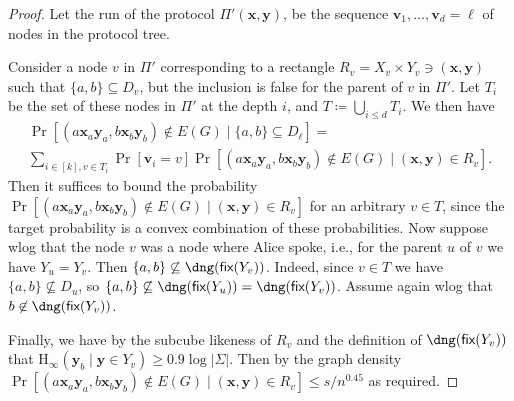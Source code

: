 \documentclass[10pt,a4paper]{article}
\theoremstyle{definition}
\theoremstyle{remark}
\theoremstyle{example}
\theoremstyle{plain}
\newcommand{\fix}{\textsf{\upshape fix}}
\newcommand{\Hmin}{\mathrm{H}_{\infty}}
\newcommand{\xbf}{\bm{x}}
\newcommand{\ybf}{\bm{y}}
\newcommand{\vbf}{\bm{v}}
\newcommand{\protocolPiAlt}{\Pi'}
\begin{document}
{}{
\begin{proof}
Let the run of the protocol $\protocolPiAlt(\xbf,\ybf)$, be the sequence $\vbf_1, \dots, \vbf_d = \bm \ell$ of nodes in the protocol tree. 


Consider a node $v$ in $\protocolPiAlt$ corresponding to a rectangle $R_v = X_v \times Y_v \ni (\bm x, \bm y)$ such that $\{a,b\} \subseteq D_v$, but the inclusion is false for the parent of $v$ in $\protocolPiAlt$. Let $T_{i}$ be the set of these nodes in $\protocolPiAlt$ at the depth $i$, and $T \coloneqq \bigcup_{i \le d} T_i$. We then have
 \begin{multline*}
\Pr[(a \bm x_a \bm y_a, b \bm x_b \bm y_b) \not\in E(G) \mid \{a,b\} \subseteq D_{\bm \ell}] = \\\sum_{i \in [k], v \in T_{i}} \Pr[\bm v_i = v] \Pr[(a \bm x_a \bm y_a, b \bm x_b \bm y_b) \not\in E(G) \mid (\bm x, \bm y) \in R_v].
 \end{multline*}
Then it suffices to bound the probability $\Pr[(a \bm x_a \bm y_a, b \bm x_b \bm y_b) \not\in E(G) \mid (\bm x, \bm y) \in R_v]$ for an arbitrary $v \in T$, since the target probability is a convex combination of these probabilities.
Now suppose wlog that the node $v$ was a node where Alice spoke, i.e., for the parent $u$ of $v$ we have $Y_u = Y_v$. Then $\{a,b\} \not\subseteq \dng(\fix(Y_v))$. Indeed, since $v \in T$ we have $\{a,b\} \not\subseteq D_u$, so $\{a,b\} \not\subseteq \dng(\fix(Y_u)) = \dng(\fix(Y_v))$. Assume again wlog that $b \not\in \dng(\fix(Y_v))$. 

Finally, we have by the subcube likeness of $R_v$ and the definition of $\dng(\fix(Y_v))$ that $\Hmin(\bm y_b \mid \bm y \in Y_v) \ge 0.9 \log |\Sigma|$. Then by the graph density $\Pr[(a \bm x_a \bm y_a, b \bm x_b \bm y_b) \not\in E(G) \mid (\bm x, \bm y) \in R_v] \le s/n^{0.45}$ as required. 
\end{proof}}
\end{document}
